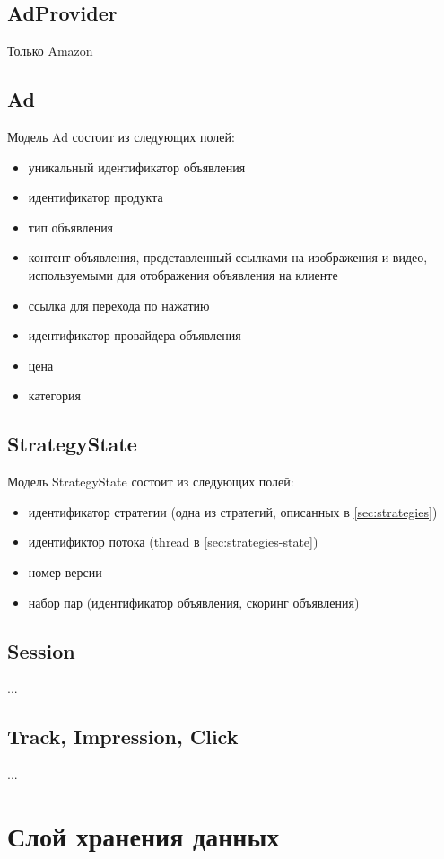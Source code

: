 \documentclass[times]{itmo-student-thesis}
\begin{document}
\subsection{AdProvider}
Только Amazon

\subsection{Ad}

Модель Ad состоит из следующих полей:
\begin{itemize}
\item уникальный идентификатор объявления
\item идентификатор продукта
\item тип объявления 
\item контент объявления, представленный ссылками на изображения и видео, используемыми для отображения объявления на клиенте
\item ссылка для перехода по нажатию
\item идентификатор провайдера объявления
\item цена
\item категория
\end{itemize}

\subsection{StrategyState}

Модель StrategyState состоит из следующих полей:
\begin{itemize}
\item идентификатор стратегии (одна из стратегий, описанных в \ref{sec:strategies})
\item идентификтор потока (thread в \ref{sec:strategies-state})
\item номер версии
\item набор пар (идентификатор объявления, скоринг объявления)
\end{itemize}


\subsection{Session}
...

\subsection{Track, Impression, Click}
...

\section{Слой хранения данных}
\end{document}
